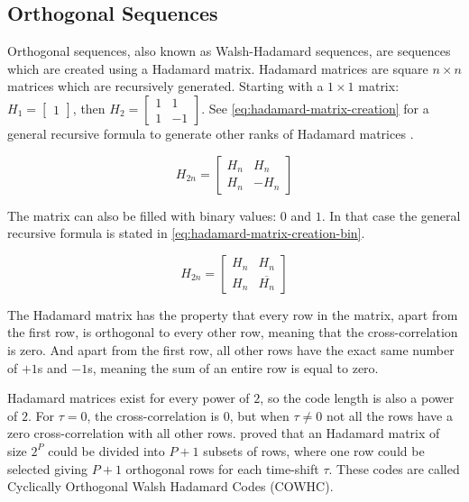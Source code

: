 
\subsection{Orthogonal Sequences}
\label{subsec:orthogonal-sequences}

Orthogonal sequences, also known as Walsh-Hadamard sequences, are sequences which are created using a Hadamard matrix.
Hadamard matrices are square $n \times n$ matrices which are recursively generated.
Starting with a $1 \times 1$ matrix: 
		$H_{1} = \begin{bmatrix} 1 \end{bmatrix}$, then 
		$H_{2} = \begin{bmatrix} 1 & 1 \\ 1 & -1 \end{bmatrix}$.
See \autoref{eq:hadamard-matrix-creation} for a general recursive formula to generate other ranks of Hadamard matrices \cite{714616}.

\begin{equation}
	H_{2n} = 
	\begin{bmatrix} 
		H_n & H_n \\ 
		H_n & -H_n 
	\end{bmatrix}
	\label{eq:hadamard-matrix-creation}
\end{equation}

The matrix can also be filled with binary values: $0$ and $1$. In that case the general recursive formula is stated in \autoref{eq:hadamard-matrix-creation-bin}. 

\begin{equation}
	H_{2n} = 
	\begin{bmatrix} 
		H_n & H_n \\ 
		H_n & \overline{H_n}
	\end{bmatrix}
	\label{eq:hadamard-matrix-creation-bin}
\end{equation}




The Hadamard matrix has the property that every row in the matrix, apart from the first row, is orthogonal to every other row, meaning that the cross-correlation is zero.
And apart from the first row, all other rows have the exact same number of $+1$s and $-1$s, meaning the sum of an entire row is equal to zero.

Hadamard matrices exist for every power of $2$, so the code length is also a power of $2$.
For $\tau = 0$, the cross-correlation is $0$, but when $\tau \neq 0$ not all the rows have a zero cross-correlation with all other rows.
\cite{1182447} proved that an Hadamard matrix of size $2^P$ could be divided into $P + 1$ subsets of rows, where one row could be selected giving $P + 1$ orthogonal rows for each time-shift $\tau$.
These codes are called Cyclically Orthogonal Walsh Hadamard Codes (COWHC).

